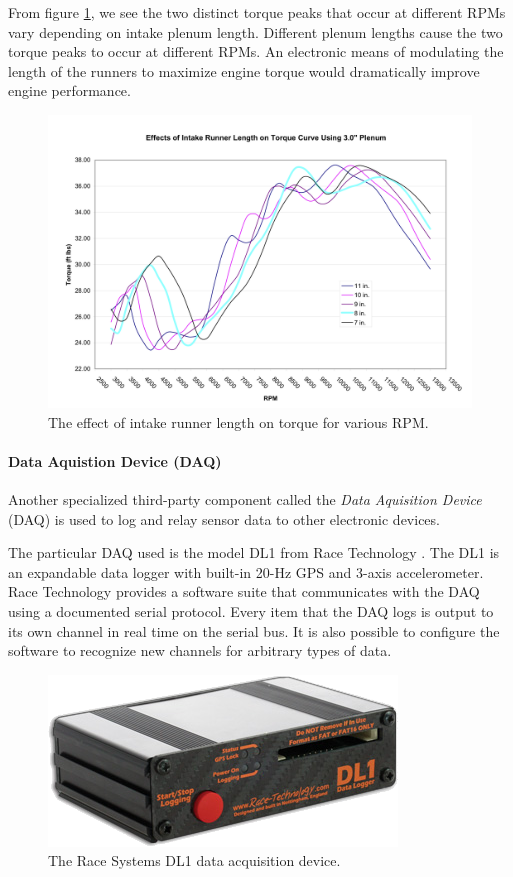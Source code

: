From figure \ref{fig:irl_effect}, we see the two distinct torque peaks that occur at different RPMs vary depending on intake plenum length. Different plenum lengths cause the two torque peaks to occur at different RPMs. An electronic means of modulating the length of the runners to maximize engine torque would dramatically improve engine performance.

\begin{figure}[H]
	\centering
	 	\includegraphics[scale=0.60]{figures/irl_effect.png}
    \caption{The effect of intake runner length on torque for various RPM.}
    \label{fig:irl_effect}
\end{figure}

\paragraph{Data Aquistion Device (DAQ)}

Another specialized third-party component called the \emph{Data Aquisition Device} (DAQ) is used to log and relay sensor data to other electronic devices.

The particular DAQ used is the model DL1 from Race Technology \cite{DL1Dsheet}. The DL1 is an expandable data logger with built-in 20-Hz GPS and 3-axis accelerometer. Race Technology provides a software suite that communicates with the DAQ using a documented serial protocol. Every item that the DAQ logs is output to its own channel in real time on the serial bus. It is also possible to configure the software to recognize new channels for arbitrary types of data. 

\begin{figure}[H]
	\centering
	 	\includegraphics[scale=0.5]{figures/dl1.png}
    \caption{The Race Systems DL1 data acquisition device.}
    \label{fig:dl1_product}
\end{figure}

